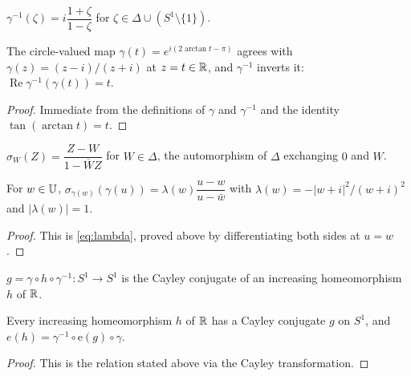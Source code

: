 \begin{definition}\label{def:cayleyInv}
	$\gamma^{-1}(\zeta)=i\dfrac{1+\zeta}{1-\zeta}$ for $\zeta\in\Delta\cup(S^1\setminus\{1\})$.
\end{definition}

\begin{lemma}\label{lem:cayleyCircle_coe}
	\leanok
	The circle-valued map $\gamma(t)=e^{i(2\arctan t-\pi)}$ agrees with
	$\gamma(z)=(z-i)/(z+i)$ at $z=t\in\mathbb{R}$, and $\gamma^{-1}$ inverts it:
	$\operatorname{Re}\gamma^{-1}(\gamma(t))=t$.
\end{lemma}
\begin{proof}
	Immediate from the definitions of $\gamma$ and $\gamma^{-1}$ and the identity
	$\tan(\arctan t)=t$.
\end{proof}

\begin{definition}\label{def:diskInvolution}
	$\sigma_W(Z)=\dfrac{Z-W}{1-\overline WZ}$ for $W\in\Delta$, the automorphism of
	$\Delta$ exchanging $0$ and $W$.
\end{definition}

\begin{lemma}\label{lem:cayley_involution_transfer}
	\leanok
	For $w\in\mathbb{U}$, $\sigma_{\gamma(w)}(\gamma(u))=\lambda(w)\dfrac{u-w}{u-\bar w}$ with
	$\lambda(w)=-|w+i|^2/(w+i)^2$ and $|\lambda(w)|=1$.
\end{lemma}
\begin{proof}
	This is \eqref{eq:lambda}, proved above by differentiating both sides at $u=w$.
\end{proof}

\begin{definition}\label{def:IsCayleyConjugate}
	$g=\gamma\circ h\circ\gamma^{-1}:S^1\to S^1$ is the Cayley conjugate of an
	increasing homeomorphism $h$ of $\mathbb{R}$.
\end{definition}

\begin{lemma}\label{lem:douadyEarle_cayley_transfer}
	Every increasing homeomorphism $h$ of $\mathbb{R}$ has a Cayley conjugate $g$ on $S^1$,
	and $e(h)=\gamma^{-1}\circ\mathrm e(g)\circ\gamma$.
\end{lemma}
\begin{proof}
	This is the relation stated above via the Cayley transformation.
\end{proof}

